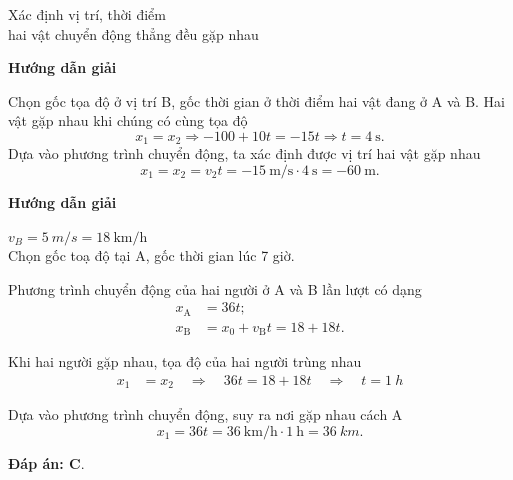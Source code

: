 \begin{dang}{Xác định vị trí, thời điểm \\hai vật chuyển động thẳng đều gặp nhau}
{	\begin{center}
		\textbf{Hướng dẫn giải}
	\end{center}
	Chọn gốc tọa độ ở vị trí B, gốc thời gian ở thời điểm hai vật đang ở A và B. 
	Hai vật gặp nhau khi chúng có cùng tọa độ
	\begin{equation*}
		x_\text{1}=x_\text{2}\Rightarrow -100+10t=-15t \Rightarrow t=\SI{4}{\second}.
	\end{equation*}
	Dựa vào phương trình chuyển động, ta xác định được vị trí hai vật gặp nhau 
	\begin{equation*}
		x_\text{1}=x_\text{2}=v_\text{2}t=\SI{-15}{\meter/\second}\cdot\SI{4}{\second}=\SI{-60}{\meter}.
	\end{equation*}
}
{	\begin{center}
		\textbf{Hướng dẫn giải}
	\end{center}
	$v_B = \SI{5}{m/s}=\SI{18}{\kilo\meter/\hour}$\\
	Chọn gốc toạ độ tại A, gốc thời gian lúc 7 giờ.
	
	Phương trình chuyển động của hai người ở A và B lần lượt có dạng 
	\begin{align*}
		x_\text{A} &= 36t;\\
		x_\text{B} &=x_0+v_\text{B}t=18+18t.
	\end{align*}
	
	Khi hai người gặp nhau, tọa độ của hai người trùng nhau  
	\begin{align*}
		x_1&=x_2 \quad
		\Rightarrow\quad 36t=18+18t\quad\Rightarrow\quad t=\SI{1}{h}
	\end{align*}
	
	Dựa vào phương trình chuyển động, suy ra nơi gặp nhau cách A
	$$x_\text{1}  =36t=\SI{36}{\kilo\meter/\hour}\cdot\SI{1}{\hour}= \SI{36}{km}.$$
	
	
	\textbf{Đáp án: C}.
}
\end{dang}

